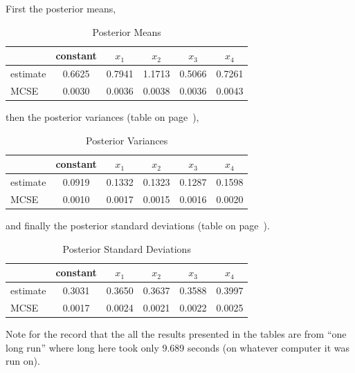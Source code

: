 \documentclass[12pt]{article}
\begin{document}
First the posterior means,
\begin{table}[ht]
\caption{Posterior Means}
\label{tab:mu}
\begin{center}
\begin{tabular}{lccccc}
  \hline
 & constant & $x_1$ & $x_2$ & $x_3$ & $x_4$ \\ 
  \hline
estimate & 0.6625 & 0.7941 & 1.1713 & 0.5066 & 0.7261 \\ 
  MCSE & 0.0030 & 0.0036 & 0.0038 & 0.0036 & 0.0043 \\ 
   \hline
\end{tabular}\end{center}
\end{table}
then the posterior variances (table on page~\pageref{tab:sigmasq}),
\begin{table}[ht]
\caption{Posterior Variances}
\label{tab:sigmasq}
\begin{center}
\begin{tabular}{lccccc}
  \hline
 & constant & $x_1$ & $x_2$ & $x_3$ & $x_4$ \\ 
  \hline
estimate & 0.0919 & 0.1332 & 0.1323 & 0.1287 & 0.1598 \\ 
  MCSE & 0.0010 & 0.0017 & 0.0015 & 0.0016 & 0.0020 \\ 
   \hline
\end{tabular}\end{center}
\end{table}
and finally the posterior standard deviations
(table on page~\pageref{tab:sigma}).
\begin{table}[ht]
\caption{Posterior Standard Deviations}
\label{tab:sigma}
\begin{center}
\begin{tabular}{lccccc}
  \hline
 & constant & $x_1$ & $x_2$ & $x_3$ & $x_4$ \\ 
  \hline
estimate & 0.3031 & 0.3650 & 0.3637 & 0.3588 & 0.3997 \\ 
  MCSE & 0.0017 & 0.0024 & 0.0021 & 0.0022 & 0.0025 \\ 
   \hline
\end{tabular}\end{center}
\end{table}

Note for the record that the all the results presented in the tables
are from ``one long run'' where long here took only
9.689 seconds (on whatever computer it was run on).
\end{document}
